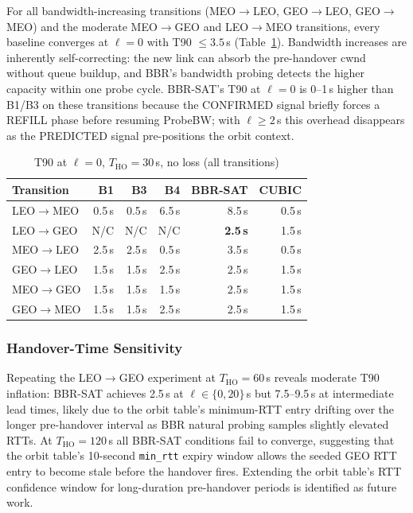 \documentclass[conference]{IEEEtran}
\begin{document}
For all bandwidth-increasing transitions (MEO$\to$LEO, GEO$\to$LEO,
GEO$\to$MEO) and the moderate MEO$\to$GEO and LEO$\to$MEO transitions,
every baseline converges at $\ell = 0$ with T90 $\leq 3.5$\,s
(Table~\ref{tab:exp1_all_transitions}).
Bandwidth increases are inherently self-correcting: the new link can absorb
the pre-handover cwnd without queue buildup, and BBR's bandwidth probing
detects the higher capacity within one probe cycle.
BBR-SAT's T90 at $\ell = 0$ is 0--1\,s higher than B1/B3 on these
transitions because the CONFIRMED signal briefly forces a REFILL
phase before resuming ProbeBW; with $\ell \geq 2$\,s this overhead
disappears as the PREDICTED signal pre-positions the orbit context.

\begin{table}[t]
\centering
\caption{T90 at $\ell = 0$, $T_\mathrm{HO} = 30$\,s, no loss (all transitions)}
\label{tab:exp1_all_transitions}
\small
\setlength{\tabcolsep}{4pt}
\begin{tabular}{lrrrrr}
\toprule
Transition & B1 & B3 & B4 & BBR-SAT & CUBIC \\
\midrule
LEO$\to$MEO  & 0.5\,s & 0.5\,s & 6.5\,s & 8.5\,s  & 0.5\,s \\
LEO$\to$GEO  & N/C    & N/C    & N/C    & \textbf{2.5\,s} & 1.5\,s \\
MEO$\to$LEO  & 2.5\,s & 2.5\,s & 0.5\,s & 3.5\,s  & 0.5\,s \\
GEO$\to$LEO  & 1.5\,s & 1.5\,s & 2.5\,s & 2.5\,s  & 1.5\,s \\
MEO$\to$GEO  & 1.5\,s & 1.5\,s & 1.5\,s & 2.5\,s  & 1.5\,s \\
GEO$\to$MEO  & 1.5\,s & 1.5\,s & 2.5\,s & 2.5\,s  & 1.5\,s \\
\bottomrule
\end{tabular}
\end{table}

\subsubsection{Handover-Time Sensitivity}

Repeating the LEO$\to$GEO experiment at $T_\mathrm{HO} = 60$\,s reveals
moderate T90 inflation: BBR-SAT achieves 2.5\,s at $\ell \in \{0, 20\}$\,s
but 7.5--9.5\,s at intermediate lead times, likely due to the orbit table's
minimum-RTT entry drifting over the longer pre-handover interval as
BBR natural probing samples slightly elevated RTTs.
At $T_\mathrm{HO} = 120$\,s all BBR-SAT conditions fail to converge,
suggesting that the orbit table's 10-second \texttt{min\_rtt} expiry window
allows the seeded GEO RTT entry to become stale before the handover fires.
Extending the orbit table's RTT confidence window for long-duration
pre-handover periods is identified as future work.
\end{document}
